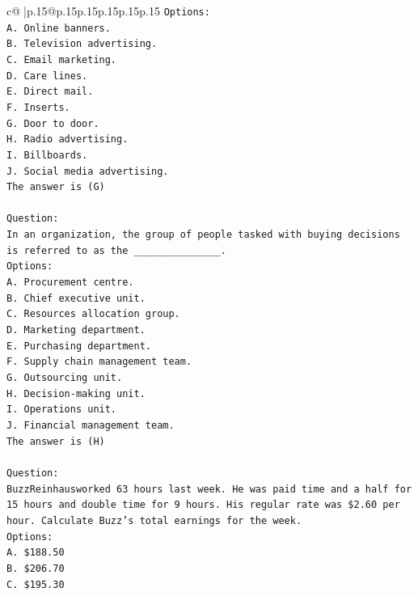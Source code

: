\documentclass{article}
\begin{document}
{\begin{supertabular}{c@{$\;$}|p{.15\linewidth}@{}p{.15\linewidth}p{.15\linewidth}p{.15\linewidth}p{.15\linewidth}p{.15\linewidth}}
{{{\texttt{Options:} \\
\texttt{A. Online banners.} \\
\texttt{B. Television advertising.} \\
\texttt{C. Email marketing.} \\
\texttt{D. Care lines.} \\
\texttt{E. Direct mail.} \\
\texttt{F. Inserts.} \\
\texttt{G. Door to door.} \\
\texttt{H. Radio advertising.} \\
\texttt{I. Billboards.} \\
\texttt{J. Social media advertising.} \\
\texttt{The answer is (G)} \\
\\ 
\texttt{Question:} \\
\texttt{In an organization, the group of people tasked with buying decisions is referred to as the \_\_\_\_\_\_\_\_\_\_\_\_\_\_\_.} \\
\texttt{Options:} \\
\texttt{A. Procurement centre.} \\
\texttt{B. Chief executive unit.} \\
\texttt{C. Resources allocation group.} \\
\texttt{D. Marketing department.} \\
\texttt{E. Purchasing department.} \\
\texttt{F. Supply chain management team.} \\
\texttt{G. Outsourcing unit.} \\
\texttt{H. Decision{-}making unit.} \\
\texttt{I. Operations unit.} \\
\texttt{J. Financial management team.} \\
\texttt{The answer is (H)} \\
\\ 
\texttt{Question:} \\
\texttt{BuzzReinhausworked 63 hours last week. He was paid time and a half for 15 hours and double time for 9 hours. His regular rate was \$2.60 per hour. Calculate Buzz's total earnings for the week.} \\
\texttt{Options:} \\
\texttt{A. \$188.50} \\
\texttt{B. \$206.70} \\
\texttt{C. \$195.30} \\
}}}
\end{supertabular}}
\end{document}
